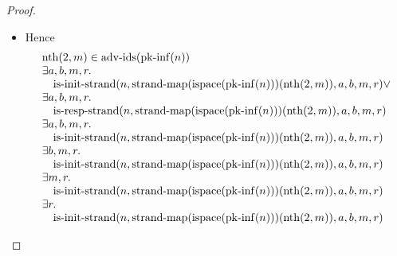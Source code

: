 \documentclass[11pt]{article}
\theoremstyle{plain}
\begin{document}
\begin{proof}
\begin{itemize}[leftmargin=2.8em, itemsep=4pt, parsep=1pt]
\begin{itemize}[leftmargin=2.8em, itemsep=4pt, parsep=1pt]
  \item[\textbf{324--331}] Hence 
\begin{equation*}
\begin{array}{@{}l@{}}
\operatorname{nth}(2, m) \in \operatorname{adv\text{-}ids}(\operatorname{pk\text{-}inf}(n)) \\
\begin{array}{@{}l@{}} \exists a, b, m, r. \\ \quad \operatorname{is\text{-}init\text{-}strand}(n, \operatorname{strand\text{-}map}(\operatorname{ispace}(\operatorname{pk\text{-}inf}(n)))(\operatorname{nth}(2, m)), a, b, m, r) \vee \\ \exists a, b, m, r. \\ \quad \operatorname{is\text{-}resp\text{-}strand}(n, \operatorname{strand\text{-}map}(\operatorname{ispace}(\operatorname{pk\text{-}inf}(n)))(\operatorname{nth}(2, m)), a, b, m, r) \end{array} \\
\begin{array}{@{}l@{}} \exists a, b, m, r. \\ \quad \operatorname{is\text{-}init\text{-}strand}(n, \operatorname{strand\text{-}map}(\operatorname{ispace}(\operatorname{pk\text{-}inf}(n)))(\operatorname{nth}(2, m)), a, b, m, r) \end{array} \\
\begin{array}{@{}l@{}} \exists b, m, r. \\ \quad \operatorname{is\text{-}init\text{-}strand}(n, \operatorname{strand\text{-}map}(\operatorname{ispace}(\operatorname{pk\text{-}inf}(n)))(\operatorname{nth}(2, m)), a, b, m, r) \end{array} \\
\begin{array}{@{}l@{}} \exists m, r. \\ \quad \operatorname{is\text{-}init\text{-}strand}(n, \operatorname{strand\text{-}map}(\operatorname{ispace}(\operatorname{pk\text{-}inf}(n)))(\operatorname{nth}(2, m)), a, b, m, r) \end{array} \\
\begin{array}{@{}l@{}} \exists r. \\ \quad \operatorname{is\text{-}init\text{-}strand}(n, \operatorname{strand\text{-}map}(\operatorname{ispace}(\operatorname{pk\text{-}inf}(n)))(\operatorname{nth}(2, m)), a, b, m, r) \end{array} \\

\end{array}
\end{equation*}
\end{itemize}
\end{itemize}
\end{proof}
\end{document}
